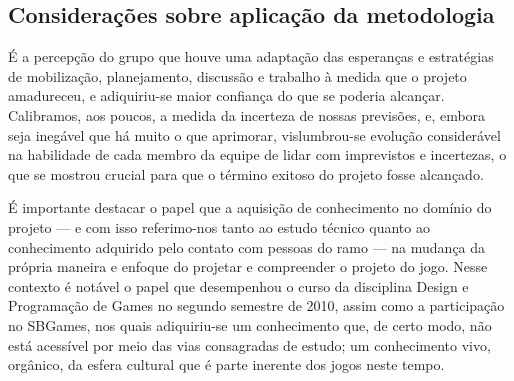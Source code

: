 \subsection{Considerações sobre aplicação da metodologia}

É a percepção do grupo que houve uma adaptação das esperanças e estratégias de mobilização, planejamento, discussão e trabalho à medida que o projeto amadureceu, e adiquiriu-se maior confiança do que se poderia alcançar. Calibramos, aos poucos, a medida da incerteza de nossas previsões, e, embora seja inegável que há muito o que aprimorar, vislumbrou-se evolução considerável na habilidade de cada membro da equipe de lidar com imprevistos e incertezas, o que se mostrou crucial para que o término exitoso do projeto fosse alcançado.

É importante destacar o papel que a aquisição de conhecimento no domínio do projeto --- e com isso referimo-nos tanto ao estudo técnico quanto ao conhecimento adquirido pelo contato com pessoas do ramo --- na mudança da própria maneira e enfoque do projetar e compreender o projeto do jogo. Nesse contexto é notável o papel que desempenhou o curso da disciplina Design e Programação de Games no segundo semestre de 2010, assim como a participação no SBGames, nos quais adiquiriu-se um conhecimento que, de certo modo, não está acessível por meio das vias consagradas de estudo; um conhecimento vivo, orgânico, da esfera cultural que é parte inerente dos jogos neste tempo.
